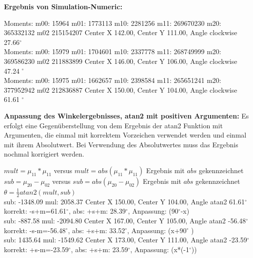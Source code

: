 \documentclass[a4paper]{report}
\begin{document}
\textbf{Ergebnis von Simulation-Numeric:}
\begin{tcolorbox}
Moments: m00: 15964 m01: 1773113 m10: 2281256 m11: 269670230 m20: 365332132 m02 215154207
Center X 142.00, Center Y 111.00, Angle clockwise 27.66$^\circ$ \\

Moments: m00: 15979 m01: 1704601 m10: 2337778 m11: 268749999 m20: 369586230 m02 211883899
Center X 146.00, Center Y 106.00, Angle clockwise 47.24 $^\circ$ \\	

Moments: m00: 15975 m01: 1662657 m10: 2398584 m11: 265651241 m20: 377952942 m02 212836887
Center X 150.00, Center Y 104.00, Angle clockwise 61.61 $^\circ$ \\
\end{tcolorbox}

\textbf{Anpassung des Winkelergebnisses, atan2 mit positiven Argumenten:}
Es erfolgt eine Gegenüberstellung von dem Ergebnis der atan2 Funktion mit Argumenten, die einmal mit korrektem Vorzeichen verwendet werden und einmal mit ihrem Absolutwert. Bei Verwendung des Absolutwertes muss das Ergebnis nochmal korrigiert werden.
\begin{tcolorbox}
$mult = \mu_{11}* \mu_{11}$ versus $mult = abs(\mu_{11}* \mu_{11})$ Ergebnis mit $abs$ gekennzeichnet\\
$sub = \mu_{20}-\mu_{02}$ versus $sub = abs(\mu_{20}-\mu_{02})$ Ergebnis mit $abs$ gekennzeichnet\\
$\theta = \frac{1}{2} atan2(mult, sub)$\\
sub: -1348.09 mul: 2058.37 Center X 150.00, Center Y 104.00, Angle atan2 61.61$^\circ$  \\
korrekt: -s+m=61.61$^\circ$, abs: +s+m: 28.39$^\circ$, Anpassung: (90$^\circ$-x)\\

sub: -887.58 mul: -2094.80 Center X 167.00, Center Y 105.00, Angle atan2 -56.48$^\circ$ \\
korrekt: -s-m=-56.48$^\circ$, abs: +s+m: 33.52$^\circ$, Anpassung: (x+90$^\circ$ )\\

sub: 1435.64 mul: -1549.62 Center X 173.00, Center Y 111.00, Angle atan2 -23.59$^\circ$ \\
korrekt: +s-m=-23.59$^\circ$, abs: +s+m: 23.59$^\circ$, Anpassung: (x*(-1$^\circ$))\\
\end{tcolorbox}
\end{document}
